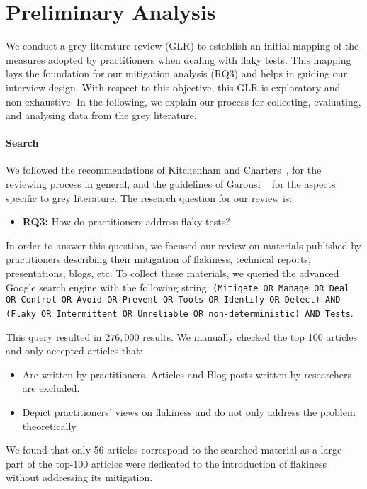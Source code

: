 \section{Preliminary Analysis}
\label{sec:survey-preliminary}

We conduct a grey literature review (GLR) to establish an initial mapping of the measures adopted by practitioners when dealing with flaky tests.
This mapping lays the foundation for our mitigation analysis (RQ3) and helps in guiding our interview design.
With respect to this objective, this GLR is exploratory and non-exhaustive.  
In the following, we explain our process for collecting, evaluating, and analysing data from the grey literature.
\paragraph{Search}
We followed the recommendations of Kitchenham and Charters~\cite{kit_cha_2007}, for the reviewing process in general, and the guidelines of Garousi \etal~\cite{garousi2019guidelines} for the aspects specific to grey literature.
The research question for our review is:
\begin{itemize}
    \item \textsc{\textbf{RQ3:}} How do practitioners address flaky tests?
\end{itemize}
In order to answer this question, we focused our review on materials published by practitioners describing their mitigation of flakiness, \eg technical reports, presentations, blogs, etc.
To collect these materials, we queried the advanced Google search engine with the following string:
\texttt{(Mitigate OR Manage OR Deal OR Control OR Avoid OR Prevent OR Tools OR Identify OR Detect) AND (Flaky OR Intermittent OR Unreliable OR non-deterministic) AND Tests}.

This query resulted in $276,000$ results.
We manually checked the top 100 articles and only accepted articles that:
\begin{itemize}
    \item Are written by practitioners. Articles and Blog posts written by researchers are excluded.
    \item Depict practitioners' views on flakiness and do not only address the problem theoretically.
\end{itemize}
We found that only 56 articles correspond to the searched material as a large part of the top-100 articles were dedicated to the introduction of flakiness without addressing its mitigation.

